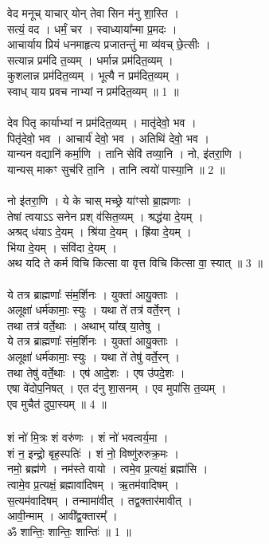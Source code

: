 \subsubsection{}
वेद मनूच् याचार् योन् तेवा सिन म॑नु शा॒स्ति ।\\
सत्यं॒ वद । धर्मं॒ चर । स्वाध्याया᳚न्मा प्र॒मदः ।\\
आचार्याय प्रियं धनमाहृत्य प्रजातन्तुं मा व्य॑वच् छे॒त्सीः ।\\
सत्यान्न प्रम॑दि त॒व्यम् । धर्मान्न प्रम॑दित॒व्यम् ।\\
कुशलान्न प्रम॑दित॒व्यम् । भूत्यै न प्रम॑दित॒व्यम् ।\\
स्वाध् याय प्रवच नाभ्यां न प्रम॑दित॒व्यम् ॥ 1 ॥\\
\\
देव पितृ कार्याभ्यां न प्रम॑दित॒व्यम् । मातृ॑देवो॒ भव ।\\
पितृ॑देवो॒ भव । आचार्य॑ देवो॒ भव । अतिथि॑ देवो॒ भव ।\\
यान्यन वद्यानि॑ कर्मा॒णि । तानि सेवि॑ तव्या॒नि । नो, इ॑तरा॒णि ।\\
यान्यस् माकꣳ सुच॑रि ता॒नि । तानि त्वयो॑ पास्या॒नि ॥ 2 ॥\\
\\
नो इ॑तरा॒णि । ये के चास् मच्छ्रे या॑ꣳसो ब्रा॒ह्मणाः ।\\
तेषां त्वयाऽऽ सनेन प्रश् व॑सित॒व्यम् । श्रद्ध॑या दे॒यम् ।\\
अश्रद् ध॑याऽ दे॒यम् । श्रि॑या दे॒यम् । ह्रि॑या दे॒यम् ।\\
भि॑या दे॒यम् । संवि॑दा दे॒यम् ।\\
अथ यदि ते कर्म विचि कित्सा वा वृत्त विचि कि॑त्सा वा॒ स्यात् ॥ 3 ॥\\
\\
ये तत्र ब्राह्मणाः᳚ संम॒र्शिनः । युक्ता॑ आयु॒क्ताः ।\\
अलूक्षा॑ धर्म॑कामाः॒ स्युः । यथा ते॑ तत्र॑ वर्ते॒रन् ।\\
तथा तत्र॑ वर्ते॒थाः । अथाभ् या᳚ख् या॒तेषु ।\\
ये तत्र ब्राह्मणाः᳚ संम॒र्शिनः । युक्ता॑ आयु॒क्ताः ।\\
अलूक्षा॑ धर्म॑कामाः॒ स्युः । यथा ते॑ तेषु॑ वर्ते॒रन् ।\\
तथा तेषु॑ वर्ते॒थाः । एष॑ आदे॒शः । एष उ॑पदे॒शः ।\\
एषा वे॑दोप॒निषत् । एत द॑नु शा॒सनम् । एव मुपा॑सि त॒व्यम् ।\\
एव मुचैत॑ दुपा॒स्यम् ॥ 4 ॥\\
\subsubsection{}
शं नो॑ मि॒त्रः शं वरु॑णः । शं नो॑ भवत्वर्य॒मा ।\\
शं न॒ इन्द्रो॒ बृह॒स्पतिः॑ । शं नो॒ विष्णु॑रुरुक्र॒मः ।\\
नमो॒ ब्रह्म॑णे । नम॑स्ते वायो । त्वमे॒व प्र॒त्यक्षं॒ ब्रह्मा॑सि ।\\
त्वामे॒व प्र॒त्यक्षं॒ ब्रह्मावा॑दिषम् । ऋ॒तम॑वादिषम् ।\\
स॒त्यम॑वादिषम् । तन्मामा॑वीत् । तद्व॒क्तार॑मावीत् ।\\
आवी॒न्माम् । आवी᳚द्व॒क्तारम्᳚ ।\\
ॐ शान्तिः॒ शान्तिः॒ शान्तिः॑ ॥ 1 ॥\\
\\

